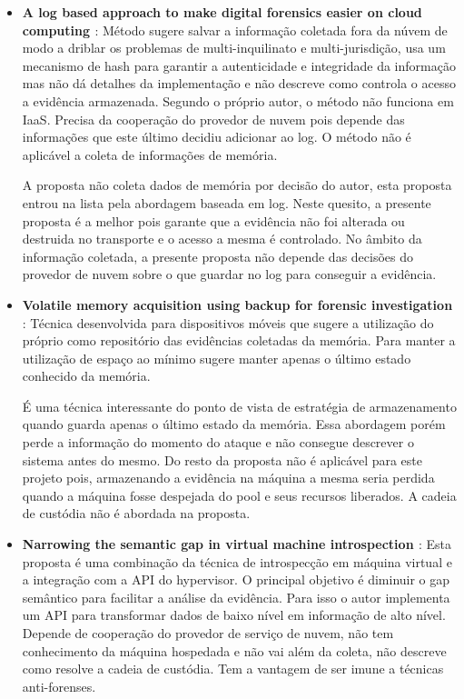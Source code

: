 \documentclass[
	12pt,				%
	openright,			%
	oneside,			%
	a4paper,			%
	english,			%
	french,				%
	spanish,			%
	brazil,				%
	]{abntex2}
\begin{document}
\begin{itemize}
\item \textbf{A log based approach to make digital forensics easier on cloud computing \cite{Sang2013} }: Método sugere salvar a informação coletada fora da núvem de modo 
a driblar os problemas de multi-inquilinato e multi-jurisdição, usa um mecanismo de hash para garantir a autenticidade e integridade da informação mas não dá detalhes da 
implementação e não descreve como controla o acesso a evidência armazenada. Segundo o próprio autor, o método não funciona em IaaS. Precisa da cooperação do provedor de 
nuvem pois depende das informações que este último decidiu adicionar ao log. O método não é aplicável a coleta de informações de memória.

A proposta não coleta dados de memória por decisão do autor, esta proposta entrou na lista pela abordagem baseada em log. Neste quesito, a presente proposta é a melhor pois 
garante que a evidência não foi alterada ou destruida no transporte e o acesso a mesma é controlado. No âmbito da informação coletada, a presente proposta não depende das 
decisões do provedor de nuvem sobre o que guardar no log para conseguir a evidência. \\

\item \textbf{Volatile memory acquisition using backup for forensic investigation \cite{Dezfouli2012} }: Técnica desenvolvida para dispositivos móveis que sugere a utilização
do próprio como repositório das evidências coletadas da memória. Para manter a utilização de espaço ao mínimo sugere manter apenas o último estado conhecido da memória.
 
É uma técnica interessante do ponto de vista de estratégia de armazenamento quando guarda apenas o último estado da memória. Essa abordagem porém perde a informação do momento 
do ataque e não consegue descrever o sistema antes do mesmo. Do resto da proposta não é aplicável para este projeto pois, armazenando a evidência na máquina a mesma seria perdida
quando a máquina fosse despejada do pool e seus recursos liberados. A cadeia de custódia não é abordada na proposta.\\

\item \textbf{Narrowing the semantic gap in virtual machine introspection \cite{Dolan-Gavitt2011a} }: Esta proposta é uma combinação da técnica de introspecção em máquina virtual
e a integração com a API do hypervisor. O principal objetivo é diminuir o gap semântico para facilitar a análise da evidência. Para isso o autor implementa um API para transformar
dados de baixo nível em informação de alto nível. Depende de cooperação do provedor de serviço de nuvem, não tem conhecimento da máquina hospedada e não vai além da coleta, não 
descreve como resolve a cadeia de custódia. Tem a vantagem de ser imune a técnicas anti-forenses.


\end{itemize}
\end{document}
